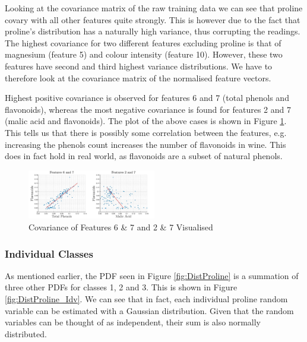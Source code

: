 \documentclass[10pt,twocolumn,letterpaper]{article}
\begin{document}
\vspace{-5mm}

Looking at the covariance matrix of the raw training data we can see that proline covary with all other features quite strongly. This is however due to the fact that proline's distribution has a naturally high variance, thus corrupting the readings. The highest covariance for two different features excluding proline is that of magnesium (feature 5) and colour intensity (feature 10). However, these two features have second and third highest variance distributions. We have to therefore look at the covariance matrix of the normalised feature vectors.

Highest positive covariance is observed for features 6 and 7 (total phenols and flavonoids), whereas the most negative covariance is found for features 2 and 7 (malic acid and flavonoids). The plot of the above cases is shown in Figure \ref{fig:covAll}. This tells us that there is possibly some correlation between the features, e.g. increasing the phenols count increases the number of flavonoids in wine. This does in fact hold in real world, as flavonoids are a subset of natural phenols.

\begin{figure}[H]
\centering
\includegraphics[width=0.5\textwidth]{../results/Q1_covAll}
\caption{Covariance of Features 6 \& 7 and 2 \& 7 Visualised \label{fig:covAll}}
\end{figure}

\vspace{-5mm}

\subsubsection{Individual Classes} \label{sec:CovCla}

\indent \indent As mentioned earlier, the PDF seen in Figure \ref{fig:DistProline} is a summation of three other PDFs for classes 1, 2 and 3. This is shown in Figure \ref{fig:DistProline_Idv}. We can see that in fact, each individual proline random variable can be estimated with a Gaussian distribution. Given that the random variables can be thought of as independent, their sum is also normally distributed.
\end{document}

